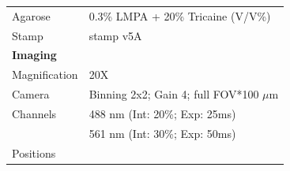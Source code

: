 \documentclass[11pt,singlespacinge,twoside]{reedthesis} %
\begin{document}
\begin{longtable}[]{@{}ll@{}}
\begin{minipage}[t]{0.21\columnwidth}
Agarose\strut
\end{minipage} & \begin{minipage}[t]{0.73\columnwidth}\raggedright
0.3\% LMPA + 20\% Tricaine (V/V\%)\strut
\end{minipage}\tabularnewline
\begin{minipage}[t]{0.21\columnwidth}\raggedright
Stamp\strut
\end{minipage} & \begin{minipage}[t]{0.73\columnwidth}\raggedright
stamp v5A\strut
\end{minipage}\tabularnewline
\begin{minipage}[t]{0.21\columnwidth}\raggedright
\textbf{Imaging}\strut
\end{minipage} & \begin{minipage}[t]{0.73\columnwidth}\raggedright
\strut
\end{minipage}\tabularnewline
\begin{minipage}[t]{0.21\columnwidth}\raggedright
Magnification\strut
\end{minipage} & \begin{minipage}[t]{0.73\columnwidth}\raggedright
20X\strut
\end{minipage}\tabularnewline
\begin{minipage}[t]{0.21\columnwidth}\raggedright
Camera\strut
\end{minipage} & \begin{minipage}[t]{0.73\columnwidth}\raggedright
Binning 2x2; Gain 4; full FOV*100 \(\mu\)m\strut
\end{minipage}\tabularnewline
\begin{minipage}[t]{0.21\columnwidth}\raggedright
Channels\strut
\end{minipage} & \begin{minipage}[t]{0.73\columnwidth}\raggedright
488 nm (Int: 20\%; Exp: 25ms)\strut
\end{minipage}\tabularnewline
\begin{minipage}[t]{0.21\columnwidth}\raggedright
\strut
\end{minipage} & \begin{minipage}[t]{0.73\columnwidth}\raggedright
561 nm (Int: 30\%; Exp: 50ms)\strut
\end{minipage}\tabularnewline
\begin{minipage}[t]{0.21\columnwidth}\raggedright
Positions\strut
\end{minipage} & \begin{minipage}[t]{0.73\columnwidth}\raggedright

\end{minipage}
\end{longtable}
\end{document}
